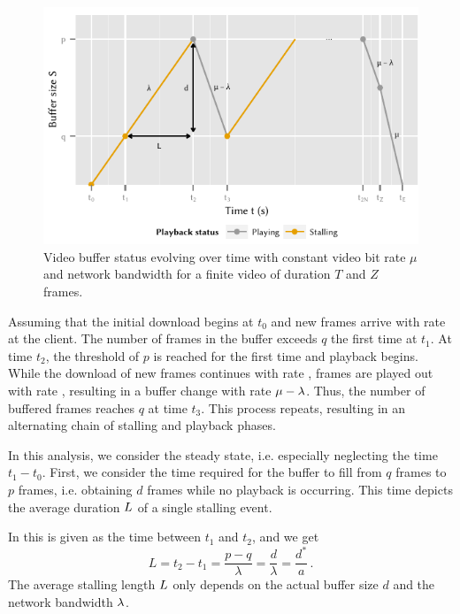 \begin{figure}
  \centering
  \includegraphics{application/qoe_user_behaviour/system_model/figures/player}
  \caption{Video buffer status evolving over time with constant video bit rate \(\mu\) and network bandwidth for a finite video of duration \(T\) and \(Z\) frames.}
  \label{fig:application:qoe_user_behaviour:system_model:steady_state:player}
\end{figure}

Assuming that the initial download begins at \(t_0\) and new frames arrive with rate \networkBandwidth at the client.
The number of frames in the buffer \currentNumberFrames exceeds \(q\) the first time at \(t_1\).
At time \(t_2\), the threshold of \(p\) is reached for the first time and playback begins.
While the download of new frames continues with rate \networkBandwidth, frames are played out with rate \playbackRate, resulting in a buffer change with rate \(\mu - \lambda\).
Thus, the number of buffered frames \currentNumberFrames reaches \(q\) at time \(t_3\).
This process repeats, resulting in an alternating chain of stalling and playback phases.

In this analysis, we consider the steady state, i.e. especially neglecting the time \(t_1 - t_0\).
First, we consider the time required for the buffer to fill from \(q\) frames to \(p\) frames, i.e. obtaining \(d\) frames while no playback is occurring.
This time depicts the average duration \(L\) of a single stalling event.

In  this is given as the time between \(t_1\) and \(t_2\), and we get
\begin{equation*}
L=t_2-t_1 = \frac{p-q}{\lambda}=\frac{d}{\lambda} = \frac{d^*}{a}\, .
\end{equation*}
The average stalling length \(L\) only depends on the actual buffer size \(d\) and the network bandwidth \(\lambda\).

